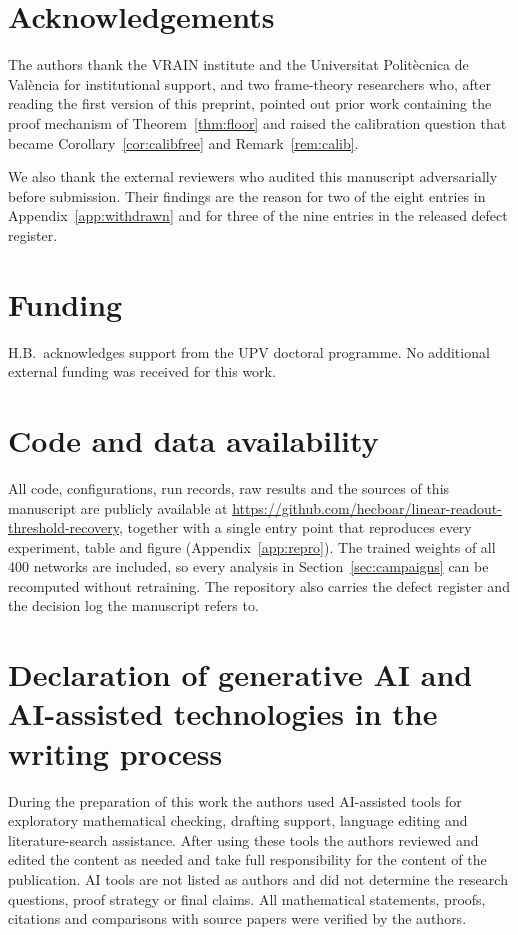 
\section*{Acknowledgements}
The authors thank the VRAIN institute and the Universitat Polit\`ecnica de Val\`encia for
institutional support, and two frame-theory researchers who, after reading the first version of this
preprint, pointed out prior work containing the proof mechanism of Theorem~\ref{thm:floor} and raised
the calibration question that became Corollary~\ref{cor:calibfree} and Remark~\ref{rem:calib}.

We also thank the external reviewers who audited this manuscript adversarially before submission.
Their findings are the reason for two of the eight entries in Appendix~\ref{app:withdrawn} and for
three of the nine entries in the released defect register.

\section*{Funding}
H.B.\ acknowledges support from the UPV doctoral programme. No additional external funding was
received for this work.

\section*{Code and data availability}
All code, configurations, run records, raw results and the sources of this manuscript are publicly
available at \url{https://github.com/hecboar/linear-readout-threshold-recovery}, together with a
single entry point that reproduces every experiment, table and figure (Appendix~\ref{app:repro}).
The trained weights of all 400 networks are included, so every analysis in
Section~\ref{sec:campaigns} can be recomputed without retraining. The repository also carries the
defect register and the decision log the manuscript refers to.

\section*{Declaration of generative AI and AI-assisted technologies in the writing process}
During the preparation of this work the authors used AI-assisted tools for exploratory mathematical
checking, drafting support, language editing and literature-search assistance. After using these
tools the authors reviewed and edited the content as needed and take full responsibility for the
content of the publication. AI tools are not listed as authors and did not determine the research
questions, proof strategy or final claims. All mathematical statements, proofs, citations and
comparisons with source papers were verified by the authors.
